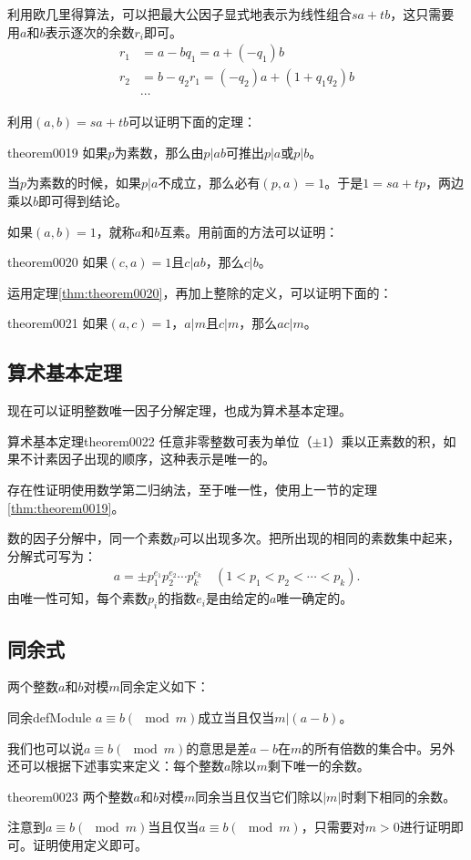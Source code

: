 利用欧几里得算法，可以把最大公因子显式地表示为线性组合$sa+tb$，这只需要用$a$和$b$表示逐次的余数$r_i$即可。
\[
\begin{aligned}
r_1 &= a - bq_1 = a + (-q_1)b \\
r_2 &= b - q_2r_1 = (-q_2)a + (1 + q_1q_2)b \\
&\cdots
\end{aligned}
\]

利用$(a, b) = sa+tb$可以证明下面的定理：
\begin{theorem}{}{theorem0019}
如果$p$为素数，那么由$p|ab$可推出$p|a$或$p|b$。
\end{theorem}

当$p$为素数的时候，如果$p|a$不成立，那么必有$(p, a)=1$。于是$1 = sa+tp$，两边乘以$b$即可得到结论。

如果$(a, b)=1$，就称$a$和$b$互素。用前面的方法可以证明：
\begin{theorem}{}{theorem0020}
如果$(c, a)=1$且$c|ab$，那么$c|b$。
\end{theorem}

运用定理\ref{thm:theorem0020}，再加上整除的定义，可以证明下面的：
\begin{theorem}{}{theorem0021}
如果$(a, c)=1$，$a|m$且$c|m$，那么$ac|m$。
\end{theorem}


\subsection{算术基本定理}\label{subsection0010108}
现在可以证明整数唯一因子分解定理，也成为算术基本定理。
\begin{theorem}{算术基本定理}{theorem0022}
任意非零整数可表为单位（$\pm{}1$）乘以正素数的积，如果不计素因子出现的顺序，这种表示是唯一的。
\end{theorem}

存在性证明使用数学第二归纳法，至于唯一性，使用上一节的定理\ref{thm:theorem0019}。

数的因子分解中，同一个素数$p$可以出现多次。把所出现的相同的素数集中起来，分解式可写为：
\begin{gather}\label{equation0015}
a = \pm{}p_1^{e_1}p_2^{e_2} \cdots p_k^{e_k} \quad (1 < p_1 < p_2 < \cdots < p_k).
\end{gather}
由唯一性可知，每个素数$p_i$的指数$e_i$是由给定的$a$唯一确定的。


\subsection{同余式}\label{subsection0010109}
两个整数$a$和$b$对模$m$同余定义如下：
\begin{definition}{同余}{defModule}
$a \equiv b (\mod{m})$成立当且仅当$m|(a-b)$。
\end{definition}
我们也可以说$a \equiv b(\mod{m})$的意思是差$a-b$在$m$的所有倍数的集合中。另外还可以根据下述事实来定义：每个整数$a$除以$m$剩下唯一的余数。
\begin{theorem}{}{theorem0023}
两个整数$a$和$b$对模$m$同余当且仅当它们除以$|m|$时剩下相同的余数。
\end{theorem}
注意到$a \equiv b(\mod{m})$当且仅当$a \equiv b(\mod{m})$，只需要对$m>0$进行证明即可。证明使用定义即可。

